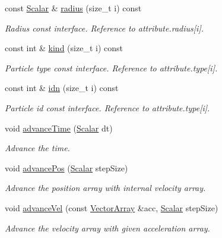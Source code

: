 \begin{DoxyCompactItemize}
const \mbox{\hyperlink{classparticles_a57a6b6582045a4b20742b99c513e9f63}{Scalar}} \& \mbox{\hyperlink{classparticles_a0cfef4b7cd6b082df8be56dff927a0d5}{radius}} (size\+\_\+t i) const
\begin{DoxyCompactList}\small\item\em Radius const interface. Reference to attribute.\+radius\mbox{[}i\mbox{]}. \end{DoxyCompactList}\item 
const int \& \mbox{\hyperlink{classparticles_abe61f1f99b1ea75e9b87927d1012a1f2}{kind}} (size\+\_\+t i) const
\begin{DoxyCompactList}\small\item\em Particle type const interface. Reference to attribute.\+type\mbox{[}i\mbox{]}. \end{DoxyCompactList}\item 
const int \& \mbox{\hyperlink{classparticles_aff81c64079780f86f8d61648d68de12e}{idn}} (size\+\_\+t i) const
\begin{DoxyCompactList}\small\item\em Particle id const interface. Reference to attribute.\+type\mbox{[}i\mbox{]}. \end{DoxyCompactList}\item 
void \mbox{\hyperlink{classparticles_a1d8e3660ebc35d0e422942aa05621cb9}{advance\+Time}} (\mbox{\hyperlink{classparticles_a57a6b6582045a4b20742b99c513e9f63}{Scalar}} dt)
\begin{DoxyCompactList}\small\item\em Advance the time. \end{DoxyCompactList}\item 
void \mbox{\hyperlink{classparticles_aba80bb0aa2f0c0aa9c6f14e12527b555}{advance\+Pos}} (\mbox{\hyperlink{classparticles_a57a6b6582045a4b20742b99c513e9f63}{Scalar}} step\+Size)
\begin{DoxyCompactList}\small\item\em Advance the position array with internal velocity array. \end{DoxyCompactList}\item 
void \mbox{\hyperlink{classparticles_a7d515e6e655de14cdfbf6e943992ebfb}{advance\+Vel}} (const \mbox{\hyperlink{classparticles_ac5dddc8c666e4f7057b5109f95926363}{Vector\+Array}} \&acc, \mbox{\hyperlink{classparticles_a57a6b6582045a4b20742b99c513e9f63}{Scalar}} step\+Size)
\begin{DoxyCompactList}\small\item\em Advance the velocity array with given acceleration array. \end{DoxyCompactList}\end{DoxyCompactItemize}
